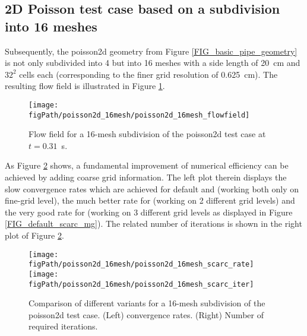 \subsection{2D Poisson test case based on a subdivision into 16 meshes}
Subsequently, the {\ct poisson2d} geometry from Figure \ref{FIG_basic_pipe_geometry} is not only subdivided into 4 but into 16 meshes with a side length of 20~cm and $32^2$ cells each (corresponding to the finer grid resolution of 0.625~cm). The resulting flow field is illustrated in Figure \ref{FIG_scarc_poisson_sixteen_flowfield}.

\begin{figure}[ht]
\begin{center}
\texttt{[image: \\figPath/poisson2d\_16mesh/poisson2d\_16mesh\_flowfield]}
\end{center}
\caption[Flow field for {\ct poisson2d} with 16 meshes]{Flow field for a 16-mesh subdivision of the {\ct poisson2d} test case at $t=0.31$~s.}
\label{FIG_scarc_poisson_sixteen_flowfield}
\end{figure}

\newpage
As Figure \ref{FIG_scarc_poisson_sixteen_convergence} shows, a fundamental 
improvement of numerical efficiency can be achieved by adding coarse grid information.
The left plot therein displays the slow convergence rates which are achieved for default \scarc{} and \uscarc{} (working both only on fine-grid level), the much better rate for \scarctwolevel{} (working on 2 different grid levels) and the very good rate for \scarcmultigrid{} (working on 3 different grid levels as displayed in Figure \ref{FIG_default_scarc_mg}). The related number of \scarc{} iterations is shown in the right plot of Figure \ref{FIG_scarc_poisson_sixteen_convergence}. 



\begin{figure}[h]
\begin{center}
\texttt{[image: \\figPath/poisson2d\_16mesh/poisson2d\_16mesh\_scarc\_rate]}
\texttt{[image: \\figPath/poisson2d\_16mesh/poisson2d\_16mesh\_scarc\_iter]}
\end{center}
\caption[Comparison of the different \scarc{} variants] {Comparison of different \scarc{} variants for a 16-mesh subdivision of the {\ct poisson2d} test case. (Left) \scarc{} convergence rates.  (Right) Number of required \scarc{} iterations. }
\label{FIG_scarc_poisson_sixteen_convergence}
\end{figure}

